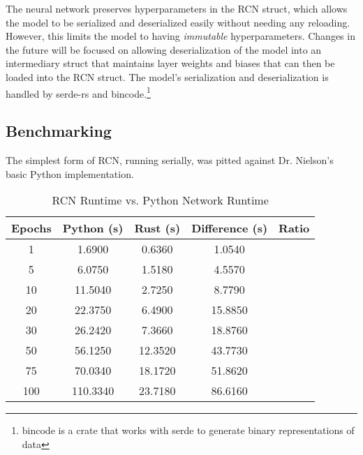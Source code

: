 \begin{multicols}{2}
The neural network preserves hyperparameters in the RCN struct, which allows the model to be serialized and deserialized
easily without needing any reloading. However, this limits the model to having \textit{immutable}
hyperparameters. Changes in the future will be focused on allowing deserialization of the model into an intermediary struct
that maintains layer weights and biases that can then be loaded into the RCN struct. The model's serialization and
deserialization is handled by serde-rs and bincode.\footnote{bincode is a crate that works with serde to generate binary representations of data}

\subsection{Benchmarking}
The simplest form of RCN, running serially, was pitted against Dr. Nielson's basic Python implementation.

\end{multicols}

\begin{table}[!htb]
    \caption{RCN Runtime vs. Python Network Runtime}
    \begin{minipage}{\linewidth}
      \centering
        \begin{tabular}{|c|c|c|c|c|}
            \hline
            Epochs & Python (s) & Rust (s) & Difference (s) & Ratio \\
            \hline\hline
            1 & 1.6900 & 0.6360 & 1.0540 \\
            5 & 6.0750 & 1.5180 & 4.5570 \\
            10 & 11.5040 & 2.7250 & 8.7790 \\
            20 & 22.3750 & 6.4900 & 15.8850 \\
            30 & 26.2420 & 7.3660 & 18.8760 \\
            50 & 56.1250 & 12.3520 & 43.7730 \\
            75 & 70.0340 & 18.1720 & 51.8620 \\
            100 & 110.3340 & 23.7180 & 86.6160 \\
            \hline
        \end{tabular}
    \end{minipage}
\end{table}
